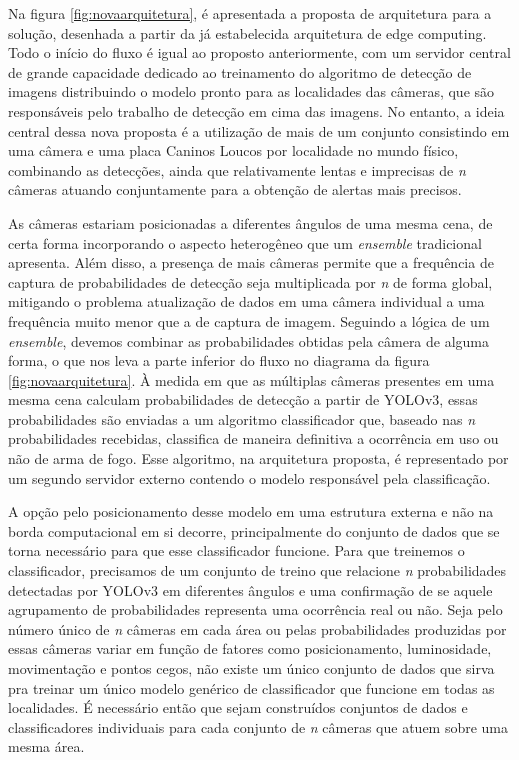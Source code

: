 \documentclass[]{politex}
\begin{document}
Na figura \ref{fig:novaarquitetura}, é apresentada a proposta de arquitetura para a solução, desenhada a partir da já estabelecida arquitetura de edge computing. Todo o início do fluxo é igual ao proposto anteriormente, com um servidor central de grande capacidade dedicado ao treinamento do algoritmo de detecção de imagens distribuindo o modelo pronto para as localidades das câmeras, que são responsáveis pelo trabalho de detecção em cima das imagens. No entanto, a ideia central dessa nova proposta é a utilização de mais de um conjunto consistindo em uma câmera e uma placa Caninos Loucos por localidade no mundo físico, combinando as detecções, ainda que relativamente lentas e imprecisas de \textit{n} câmeras atuando conjuntamente para a obtenção de alertas mais precisos.

As câmeras estariam posicionadas a diferentes ângulos de uma mesma cena, de certa forma incorporando o aspecto heterogêneo que um \textit{ensemble} tradicional apresenta. Além disso, a presença de mais câmeras permite que a frequência de captura de probabilidades de detecção seja multiplicada por \textit{n} de forma global, mitigando o problema atualização de dados em uma câmera individual a uma frequência muito menor que a de captura de imagem. Seguindo a lógica de um \textit{ensemble}, devemos combinar as probabilidades obtidas pela câmera de alguma forma, o que nos leva a parte inferior do fluxo no diagrama da figura \ref{fig:novaarquitetura}. À medida em que as múltiplas câmeras presentes em uma mesma cena calculam probabilidades de detecção a partir de YOLOv3, essas probabilidades são enviadas a um algoritmo classificador que, baseado nas \textit{n} probabilidades recebidas, classifica de maneira definitiva a ocorrência em uso ou não de arma de fogo. Esse algoritmo, na arquitetura proposta, é representado por um segundo servidor externo contendo o modelo responsável pela classificação.

A opção pelo posicionamento desse modelo em uma estrutura externa e não na borda computacional em si decorre, principalmente do conjunto de dados que se torna necessário para que esse classificador funcione. Para que treinemos o classificador, precisamos de um conjunto de treino que relacione \textit{n} probabilidades detectadas por YOLOv3 em diferentes ângulos e uma confirmação de se aquele agrupamento de probabilidades representa uma ocorrência real ou não. Seja pelo número único de \textit{n} câmeras em cada área ou pelas probabilidades produzidas por essas câmeras variar em função de fatores como posicionamento, luminosidade, movimentação e pontos cegos, não existe um único conjunto de dados que sirva pra treinar um único modelo genérico de classificador que funcione em todas as localidades. É necessário então que sejam construídos conjuntos de dados e classificadores individuais para cada conjunto de \textit{n} câmeras que atuem sobre uma mesma área.
\end{document}
